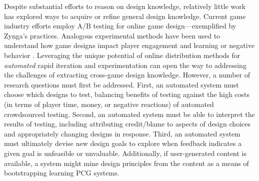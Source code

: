 \documentclass[conference]{IEEEtran}
\newcommand{\mytodo}[1]{\textbf{[[#1]]}}
\begin{document}
Despite substantial efforts to reason on design knowledge, relatively little work has explored ways to acquire or refine general design knowledge. 
Current game industry efforts employ A/B testing for online game design---exemplified by Zynga's practices.
Analogous experimental methods have been used to understand how game designs impact player engagement and learning \cite{lomas2013:opt-edugame-challenge} or negative behavior \cite{lin2013:toxic-behav}.
Leveraging the unique potential of online distribution methods for {\em automated} rapid iteration and experimentation can open the way to addressing the challenges of extracting cross-game design knowledge.
%
However, a number of research questions must first be addressed. 
First, an automated system must choose which designs to test, balancing benefits of testing against the high costs (in terms of player time, money, or negative reactions) of automated crowdsourced testing.
Second, an automated system must be able to interpret the results of testing, including attributing credit/blame to aspects of design choices and appropriately changing designs in response. 
Third, an automated system must ultimately devise new design goals to explore when feedback indicates a given goal is unfeasible or unvaluable.
%
Additionally, if user-generated content is available, a system might mine design principles from the content as a means of bootstrapping learning PCG systems.



\end{document}
